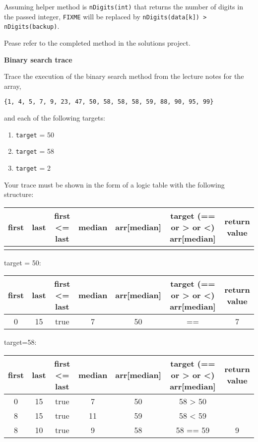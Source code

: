 \begin{questions}
\begin{solution}
Assuming helper method is \texttt{nDigits(int)} that returns the number of digits in the passed integer,  \texttt{FIXME} will be replaced by \texttt{nDigits(data[k]) > nDigits(backup)}.

Pease refer to the completed method in the solutions project.
\end{solution}

\question \textbf{Binary search trace}

Trace the execution of the binary search method from the lecture notes for the array, 
\begin{verbatim}
{1, 4, 5, 7, 9, 23, 47, 50, 58, 58, 58, 59, 88, 90, 95, 99}
\end{verbatim}

and each of the following targets:

\begin{enumerate}
  \item \texttt{target} = 50
  \item \texttt{target} = 58
  \item \texttt{target} = 2
\end{enumerate}

Your trace must be shown in the form of a logic table with the following structure:
\vskip 0.5cm

\small
\begin{tabular}{c | c | c | c | c | c | c} 
\hline
first &	last &	first <= last & median & arr[median] & target (== or > or <) arr[median] & return value\\
\hline
& & & & & & \\
\hline
\end{tabular}
\normalsize
\vskip 0.5cm

\begin{solution}
\small
target = 50:
\vskip 0.2cm
\begin{tabular}{c | c | c | c | c | c | c} 
\hline
first &	last &	first <= last & median & arr[median] & target (== or > or <) arr[median] & return value\\
\hline
0 & 15 & true & 7 & 50 & == & 7\\
\hline
\end{tabular}
\vskip 0.5cm
	
target=58:
\vskip 0.2cm
\begin{tabular}{c | c | c | c | c | c | c} 
\hline
first &	last &	first <= last & median &	 arr[median] & target (== or > or <) arr[median] & return value\\
\hline
0 & 15 & true & 7 & 50 & 58 > 50 & \\
8 & 15 & true & 11 & 59 & 58 < 59 & \\
8 & 10 & true & 9 & 58 & 58 == 59 & 9\\
\hline
\end{tabular}
\vskip 0.5cm


\end{solution}
\end{questions}
